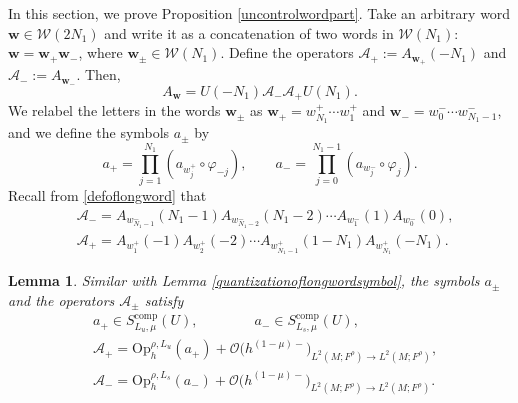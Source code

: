 \documentclass[11pt,oneside,reqno]{amsart}
\newtheorem{lemma}[theorem]{Lemma}
\theoremstyle{definition}
\numberwithin{equation}{section}
\theoremstyle{plain}
\begin{document}
In this section, we prove Proposition \ref{uncontrolwordpart}. Take an arbitrary word $\mathbf{w} \in \mathcal{W}(2 N_1)$ and write it as a concatenation of two words in $\mathcal{W}(N_1)$: $
\mathbf{w}=\mathbf{w}_{+} \mathbf{w}_{-}$, where $\mathbf{w}_{ \pm} \in \mathcal{W}(N_1)$. Define the operators $\mathcal{A}_{+}:=A_{\mathbf{w}_{+}}(-N_1)$ and $ \mathcal{A}_{-}:=A_{\mathbf{w}_{-}}$. Then,
\begin{equation*}
    A_{\mathbf{w}}=U(-N_1) \mathcal{A}_{-} \mathcal{A}_{+} U(N_1) .
\end{equation*}
We relabel the letters in the words $\mathbf{w}_{ \pm}$ as
$\mathbf{w}_{+}=w_{N_1}^{+} \cdots w_1^{+}$ and $\mathbf{w}_{-}=w_0^{-} \cdots w_{N_1-1}^{-}$, and we define the symbols $a_{\pm}$ by
\begin{equation*}
    a_{+}=\prod_{j=1}^{N_1}\left(a_{w_j^{+}} \circ \varphi_{-j}\right), \qquad a_{-}=\prod_{j=0}^{N_1-1}\left(a_{w_j^{-}} \circ \varphi_j\right) .
\end{equation*}
Recall from \eqref{defoflongword} that
\begin{equation*}
    \begin{aligned}
        & \mathcal{A}_{-}=A_{w_{N_1-1}^{-}}(N_1-1) A_{w_{N_1-2}^{-}}(N_1-2) \cdots A_{w_1^{-}}(1) A_{w_0^{-}}(0) ,\\
& \mathcal{A}_{+}=A_{w_1^{+}}(-1) A_{w_2^{+}}(-2) \cdots A_{w_{N_1-1}^{+}}(1-N_1) A_{w_{N_1}^{+}}(-N_1).
\end{aligned}
\end{equation*}


\begin{lemma}
Similar with Lemma \ref{quantizationoflongwordsymbol}, the symbols $a_{\pm}$ and the operators $\mathcal{A}_{\pm}$ satisfy
\begin{equation}
\begin{aligned}
    &a_{+} \in S_{L_u, \mu}^{\mathrm{comp}}(U), \qquad \qquad a_{-} \in S_{L_s, \mu}^{\mathrm{comp}}(U) , \\
&\mathcal{A}_{+}=\mathrm{Op}_h^{\rho, L_u} (a_{+} )+\mathcal{O}\big(h^{(1-\mu)-}\big)_{L^2(M;F^\rho) \rightarrow L^2(M;F^\rho)}, \\
&\mathcal{A}_{-}=\mathrm{Op}_h^{\rho, L_s}(a_{-})+\mathcal{O}\big(h^{(1-\mu)-}\big)_{L^2(M;F^\rho) \rightarrow L^2(M;F^\rho)} .
\end{aligned}
\end{equation}
\end{lemma}
\end{document}
